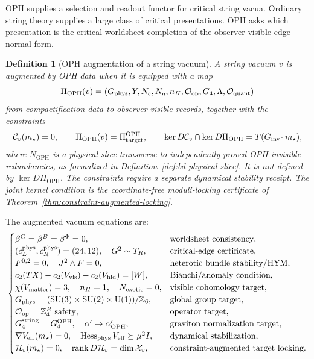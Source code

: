 \documentclass[11pt]{article}
\newtheorem{definition}[theorem]{Definition}
\theoremstyle{remark}
\theoremstyle{plain}
\newcommand{\OPH}{\mathrm{OPH}}
\newcommand{\SU}{\mathrm{SU}}
\newcommand{\U}{\mathrm{U}}
\newcommand{\Z}{\mathbb Z}
\newcommand{\calO}{\mathcal O}
\newcommand{\ZfourR}{\mathbb Z_4^R}
\begin{document}
OPH supplies a selection and readout functor for critical string vacua. Ordinary string theory
supplies a large class of critical presentations. OPH asks which presentation is the critical
worldsheet completion of the observer-visible edge normal form.

\begin{definition}[OPH augmentation of a string vacuum]
A string vacuum \(v\) is augmented by OPH data when it is equipped with a map
\[
\Pi_{\OPH}(v)=
\left(
G_{\rm phys},Y,N_c,N_g,n_H,\calO_{\rm op},G_4,\Lambda,\calO_{\rm quant}
\right)
\]
from compactification data to observer-visible records, together with the constraints
\[
\mathcal C_v(m_\star)=0,
\qquad
\Pi_{\OPH}(v)=\Pi_{\rm target}^{\OPH},
\qquad
\ker D\mathcal C_v\cap\ker D\Pi_{\OPH}=T(G_{\rm inv}\!\cdot m_\star),
\]
where \(N_{\OPH}\) is a physical slice transverse to independently proved OPH-invisible
redundancies, as formalized in Definition~\ref{def:bd-physical-slice}. It is not defined by
\(\ker D\Pi_{\OPH}\). The constraints require a separate dynamical stability receipt. The joint
kernel condition is the coordinate-free moduli-locking certificate of
Theorem~\ref{thm:constraint-augmented-locking}.
\end{definition}

The augmented vacuum equations are:
\[
\begin{cases}
\beta^G=\beta^B=\beta^\Phi=0, & \text{worldsheet consistency},\\
(c_L^{\rm phys},c_R^{\rm phys})=(24,12),\quad G^2\sim T_R, &
\text{critical-edge certificate},\\
F^{0,2}=0,\quad J^2\wedge F=0, & \text{heterotic bundle stability/HYM},\\
c_2(TX)-c_2(V_{\rm vis})-c_2(V_{\rm hid})=[W], & \text{Bianchi/anomaly condition},\\
\chi(V_{\rm matter})=3,\quad n_H=1,\quad N_{\rm exotic}=0, & \text{visible cohomology target},\\
G_{\rm phys}=(\SU(3)\times\SU(2)\times\U(1))/\Z_6, & \text{global group target},\\
\calO_{\rm op}=\ZfourR\text{ safety}, & \text{operator target},\\
G_4^{\rm string}=G_4^{\OPH},\quad \alpha'\mapsto\alpha'_{\OPH}, & \text{graviton normalization target},\\
\nabla V_{\rm eff}(m_\star)=0,\quad \operatorname{Hess}_{\rm phys}V_{\rm eff}\succeq\mu^2I,
& \text{dynamical stabilization},\\
\mathcal H_v(m_\star)=0,\quad \operatorname{rank}D\mathcal H_v=\dim\mathcal X_v,
& \text{constraint-augmented target locking}.
\end{cases}
\]
\end{document}
